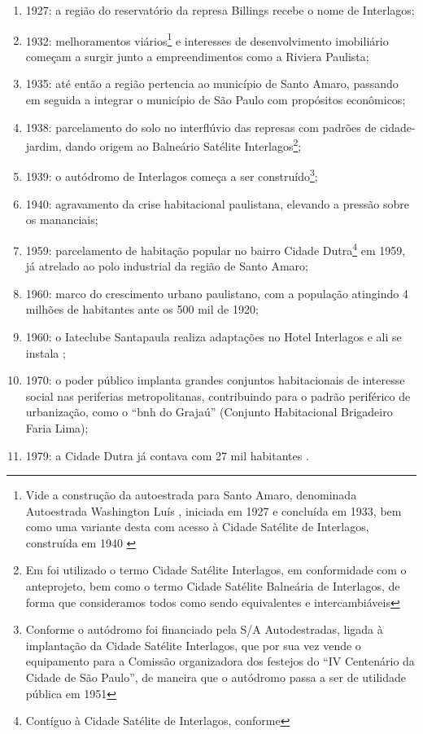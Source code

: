 	\begin{enumerate}
		\item 1927: a região do reservatório da represa Billings recebe o nome de Interlagos;
		\item 1932: melhoramentos viários\footnote{Vide a construção da autoestrada para Santo Amaro, denominada Autoestrada Washington Luís \cite[p.51]{Francca2000}, iniciada em 1927 e concluída em 1933, bem como uma variante desta com acesso à Cidade Satélite de Interlagos, construída em 1940 \cite[p.49]{Francca2000}} e interesses de desenvolvimento imobiliário começam a surgir junto a empreendimentos como a Riviera Paulista;
		\item 1935: até então a região pertencia ao município de Santo Amaro, passando em seguida a integrar o município de São Paulo com propósitos econômicos;
		\item 1938: parcelamento do solo no interflúvio das represas com padrões de cidade-jardim, dando origem ao Balneário Satélite Interlagos\footnote{Em  foi utilizado o termo Cidade Satélite Interlagos, em conformidade com o anteprojeto, bem como o termo Cidade Satélite Balneária de Interlagos, de forma que consideramos todos como sendo equivalentes e intercambiáveis};
		\item 1939: o autódromo de Interlagos começa a ser construído\footnote{Conforme  o autódromo foi financiado pela S/A Autodestradas, ligada à implantação da Cidade Satélite Interlagos, que por sua vez vende o equipamento para a Comissão organizadora dos festejos do ``IV Centenário da Cidade de São Paulo'', de maneira que o autódromo passa a ser de utilidade pública em 1951};
		\item 1940: agravamento da crise habitacional paulistana, elevando a pressão sobre os mananciais;
		\item 1959: parcelamento de habitação popular no bairro Cidade Dutra\footnote{Contíguo à Cidade Satélite de Interlagos, conforme } em 1959, já atrelado ao polo industrial da região de Santo Amaro;
		\item 1960: marco do crescimento urbano paulistano, com a população atingindo 4 milhões de habitantes ante os 500 mil de 1920;
		\item 1960: o Iateclube Santapaula realiza adaptações no Hotel Interlagos e ali se instala \cite[p.52]{Francca2000};
		\item 1970: o poder público implanta grandes conjuntos habitacionais de interesse social nas periferias metropolitanas, contribuindo para o padrão periférico de urbanização, como o ``\gls{bnh} do Grajaú'' (Conjunto Habitacional Brigadeiro Faria Lima);
		\item 1979: a Cidade Dutra já contava com 27 mil habitantes \cite[p.51]{Francca2000}.
	\end{enumerate}
	
